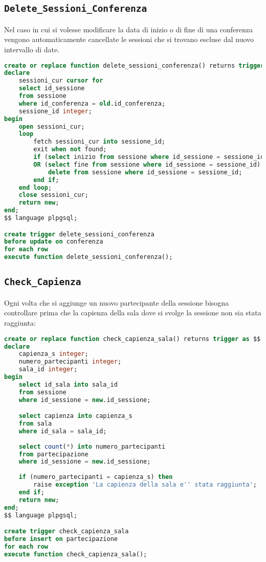 \subsection{\texttt{Delete\_Sessioni\_Conferenza}}
Nel caso in cui si volesse modificare la data di inizio o di fine di una conferenza vengono automaticamente cancellate le sessioni che si trovano escluse dal nuovo intervallo di date.
\begin{lstlisting}[language=SQL, style=mystyle, caption={\texttt{Delete\_sessioni\_conferenza}}]
create or replace function delete_sessioni_conferenza() returns trigger as $$
declare
    sessioni_cur cursor for 
    select id_sessione 
    from sessione 
    where id_conferenza = old.id_conferenza;
    sessione_id integer;
begin
    open sessioni_cur;
    loop
        fetch sessioni_cur into sessione_id;
        exit when not found;
        if (select inizio from sessione where id_sessione = sessione_id) < new.inizio 
        OR (select fine from sessione where id_sessione = sessione_id) > new.fine then
            delete from sessione where id_sessione = sessione_id;
        end if;
    end loop;
    close sessioni_cur;
    return new;
end;
$$ language plpgsql;

create trigger delete_sessioni_conferenza
before update on conferenza
for each row
execute function delete_sessioni_conferenza();
\end{lstlisting}
\subsection{\texttt{Check\_Capienza}}\label{trigger:check_capienza}
Ogni volta che si aggiunge un nuovo partecipante della sessione bisogna controllare prima che la capienza della sala dove si svolge la sessione non sia stata raggiunta:
\begin{lstlisting}[language=SQL,caption={\texttt{Check\_Capienza}},style=mystyle]
create or replace function check_capienza_sala() returns trigger as $$
declare
    capienza_s integer;
    numero_partecipanti integer;
    sala_id integer;
begin
    select id_sala into sala_id
    from sessione
    where id_sessione = new.id_sessione;

    select capienza into capienza_s
    from sala
    where id_sala = sala_id;
    
    select count(*) into numero_partecipanti
    from partecipazione
    where id_sessione = new.id_sessione;
    
    if (numero_partecipanti = capienza_s) then
        raise exception 'La capienza della sala e'' stata raggiunta';
    end if;
    return new;
end;
$$ language plpgsql;

create trigger check_capienza_sala
before insert on partecipazione
for each row
execute function check_capienza_sala();
\end{lstlisting}
